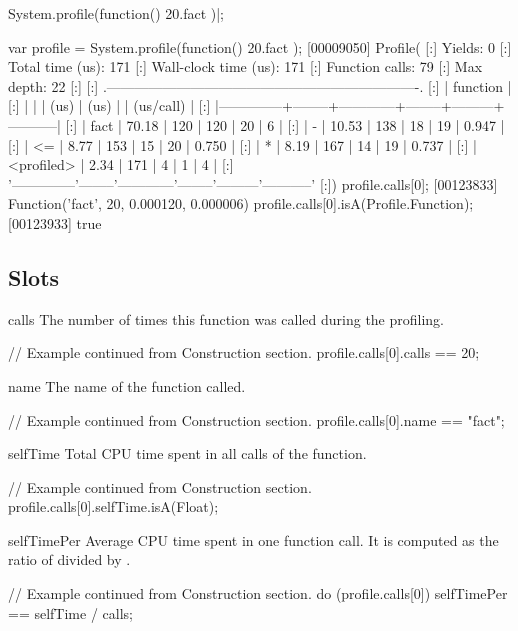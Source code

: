 \begin{urbiscript}
System.profile(function() { 20.fact })|;

var profile = System.profile(function() { 20.fact });
[00009050] Profile(
[:]  Yields:                    0
[:]  Total time (us):         171
[:]  Wall-clock time (us):    171
[:]  Function calls:           79
[:]  Max depth:                22
[:]
[:]  .-------------------------------------------------------------------.
[:]  |   function   |   %
[:]  |              |        |    (us)    |  (us)  |         | (us/call) |
[:]  |--------------+--------+------------+--------+---------+-----------|
[:]  |         fact |  70.18 |        120 |    120 |      20 |         6 |
[:]  |            - |  10.53 |        138 |     18 |      19 |     0.947 |
[:]  |           <= |   8.77 |        153 |     15 |      20 |     0.750 |
[:]  |            * |   8.19 |        167 |     14 |      19 |     0.737 |
[:]  |   <profiled> |   2.34 |        171 |      4 |       1 |         4 |
[:]  '--------------'--------'------------'--------'---------'-----------'
[:])
profile.calls[0];
[00123833] Function('fact', 20, 0.000120, 0.000006)
profile.calls[0].isA(Profile.Function);
[00123933] true
\end{urbiscript}

\subsection{Slots}

\begin{urbiscriptapi}
\item[calls]%
  The number of times this function was called during the profiling.
\begin{urbiassert}
// Example continued from Construction section.
profile.calls[0].calls == 20;
\end{urbiassert}


\item[name]%
  The name of the function called.
\begin{urbiassert}
// Example continued from Construction section.
profile.calls[0].name == "fact";
\end{urbiassert}


\item[selfTime]%
  Total CPU time spent in all calls of the function.
\begin{urbiassert}
// Example continued from Construction section.
profile.calls[0].selfTime.isA(Float);
\end{urbiassert}


\item[selfTimePer]%
  Average CPU time spent in one function call. It is computed as the ratio
  of  divided by .
\begin{urbiassert}
// Example continued from Construction section.
do (profile.calls[0])
{
  selfTimePer == selfTime / calls;
}
\end{urbiassert}
\end{urbiscriptapi}



